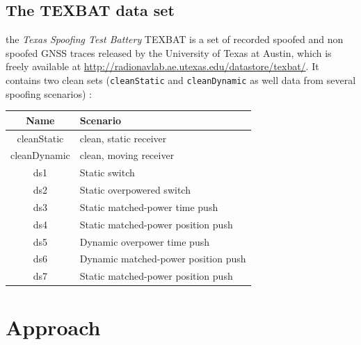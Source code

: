 \documentclass[a4paper]{usiinfbachelorproject}
\begin{document}
\newpage

	\subsection{\textbf{The TEXBAT data set}}
	
the \emph{Texas Spoofing Test Battery} TEXBAT is a set of recorded spoofed and non spoofed GNSS traces
released by the University of Texas at
Austin, which is freely
available at \href{http://radionavlab.ae.utexas.edu/datastore/texbat/}{http://radionavlab.ae.utexas.edu/datastore/texbat/}.
It contains two clean sets (\texttt{cleanStatic} and \texttt{cleanDynamic} as well data from several 
spoofing scenarios) \cite{Garbin}:  \\

\begin{tabular}{|c|l|}

\hline
\textbf{Name} & \textbf{Scenario}  \\ \hline

cleanStatic & clean, static receiver \\ \hline

cleanDynamic & clean, moving receiver \\ \hline

ds1 & Static switch \\ \hline

ds2 & Static overpowered switch \\ \hline

ds3 & Static matched-power time push \\ \hline

ds4 & Static matched-power position push \\ \hline

ds5 & Dynamic overpower time push \\ \hline

ds6 & Dynamic matched-power position push \\ \hline

ds7 & Static matched-power position push \\ \hline

\end{tabular}









\section{\textbf{Approach}}
\end{document}
